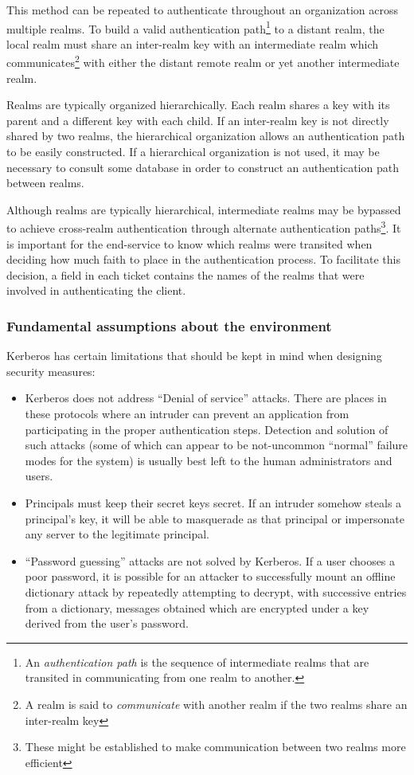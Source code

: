 This method can be repeated to authenticate throughout an organization
across multiple realms.  To build a valid authentication
path\footnote{An {\em authentication path} is the sequence of
intermediate realms that are transited in communicating from one realm
to another.} to a distant realm, the local realm must share an
inter-realm key with an intermediate realm which
communicates\footnote{A realm is said to {\em communicate} with
another realm if the two realms share an inter-realm key} with either
the distant remote realm or yet another intermediate realm.

Realms are typically organized hierarchically.  Each realm shares a
key with its parent and a different key with each child.  If an
inter-realm key is not directly shared by two realms, the hierarchical
organization allows an authentication path to be easily constructed.
If a hierarchical organization is not used, it may be necessary to
consult some database in order to construct an authentication path
between realms.

Although realms are typically hierarchical, intermediate realms may be
bypassed to achieve cross-realm authentication through alternate
authentication paths\footnote{These might be established to make communication
between two realms more efficient}.  It is important for the
end-service to know which realms were transited when deciding how much
faith to place in the authentication process.  To facilitate this
decision, a field in each ticket contains the names of the realms that
were involved in authenticating the client.

\subsubsection{Fundamental assumptions about the environment}

Kerberos has certain limitations that should be kept in mind when
designing security measures:

\begin{itemize}
\item
Kerberos does not address ``Denial of service'' attacks.  There are
places in these protocols where an intruder can prevent an application
from participating in the proper authentication steps.  Detection and
solution of such attacks (some of which can appear to be not-uncommon
``normal'' failure modes for the system) is usually best left to
the human administrators and users.

\item
Principals must keep their secret keys secret.  If an intruder somehow
steals a principal's key, it will be able to masquerade as that
principal or impersonate any server to the legitimate principal.

\item
``Password guessing'' attacks are not solved by Kerberos.  If a user
chooses a poor password, it is possible for an attacker to
successfully mount an offline dictionary attack by repeatedly
attempting to decrypt, with successive entries from a dictionary,
messages obtained which are encrypted under a key derived from the
user's password.

\end{itemize}

